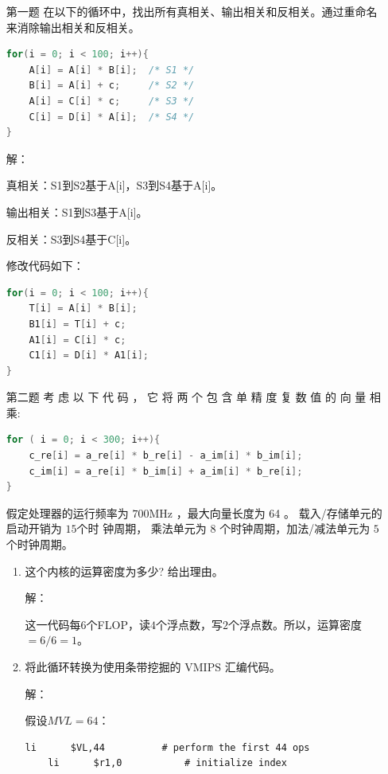 \documentclass{ctexart}
\begin{document}
\begin{enumerate}
    \item[第一题]
          在以下的循环中，找出所有真相关、输出相关和反相关。通过重命名来消除输出相关和反相关。
          \begin{lstlisting}[language=C]
for(i = 0; i < 100; i++){
    A[i] = A[i] * B[i];  /* S1 */
    B[i] = A[i] + c;     /* S2 */
    A[i] = C[i] * c;     /* S3 */
    C[i] = D[i] * A[i];  /* S4 */
}
\end{lstlisting}
          \par 解：
          \par 真相关：S1到S2基于A[i]，S3到S4基于A[i]。
          \par 输出相关：S1到S3基于A[i]。
          \par 反相关：S3到S4基于C[i]。
          \par 修改代码如下：
          \begin{lstlisting}[language=C]
for(i = 0; i < 100; i++){
    T[i] = A[i] * B[i];  
    B1[i] = T[i] + c;     
    A1[i] = C[i] * c;     
    C1[i] = D[i] * A1[i];  
}
\end{lstlisting}
    \item[第二题] 考 虑 以 下 代 码 ， 它 将 两 个 包 含 单 精 度 复 数 值 的 向 量 相 乘:
          \begin{lstlisting}[language=C]
for ( i = 0; i < 300; i++){
    c_re[i] = a_re[i] * b_re[i] - a_im[i] * b_im[i];
    c_im[i] = a_re[i] * b_im[i] + a_im[i] * b_re[i];
}
\end{lstlisting}
          假定处理器的运行频率为 $700 \mathrm{MHz}$ ，最大向量长度为 64 。
          载入/存储单元的启动开销为 $15 $个时 钟周期，
          乘法单元为 $8$ 个时钟周期，加法/减法单元为 $5$ 个时钟周期。
          \begin{enumerate}
              \item 这个内核的运算密度为多少? 给出理由。
                    \par 解：
                    \par 这一代码每$6$个FLOP，读$4$个浮点数，写$2$个浮点数。所以，运算密度$=6/6=1$。
              \item 将此循环转换为使用条带挖掘的 $\mathrm{VMIPS}$ 汇编代码。
                    \par 解：
                    \par 假设$MVL=64$：
                    \begin{lstlisting}[language={[x86masm]Assembler}]
    li      $VL,44          # perform the first 44 ops
    li      $r1,0           # initialize index

\end{lstlisting}
\end{enumerate}
\end{enumerate}
\end{document}
